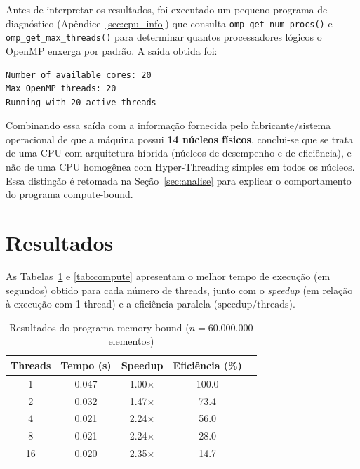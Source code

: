\documentclass[a4paper,12pt]{article}
\begin{document}
Antes de interpretar os resultados, foi executado um pequeno programa de
diagnóstico (Apêndice~\ref{sec:cpu_info}) que consulta
\texttt{omp\_get\_num\_procs()} e \texttt{omp\_get\_max\_threads()} para
determinar quantos processadores lógicos o OpenMP enxerga por padrão. A
saída obtida foi:

\begin{lstlisting}[style=cstyle, language=bash, numbers=none]
Number of available cores: 20
Max OpenMP threads: 20
Running with 20 active threads
\end{lstlisting}

Combinando essa saída com a informação fornecida pelo fabricante/sistema
operacional de que a máquina possui \textbf{14 núcleos físicos}, conclui-se
que se trata de uma CPU com arquitetura híbrida (núcleos de desempenho e de
eficiência), e não de uma CPU homogênea com Hyper-Threading simples em todos
os núcleos. Essa distinção é retomada na Seção~\ref{sec:analise} para
explicar o comportamento do programa compute-bound.

\section{Resultados}

As Tabelas~\ref{tab:memoria} e \ref{tab:compute} apresentam o melhor tempo de
execução (em segundos) obtido para cada número de threads, junto com o
\emph{speedup} (em relação à execução com 1 thread) e a eficiência paralela
($\text{speedup}/\text{threads}$).

\begin{table}[h]
    \centering
    \caption{Resultados do programa memory-bound ($n = 60.000.000$ elementos)}
    \label{tab:memoria}
    \begin{tabular}{ccccc}
        \toprule
        Threads & Tempo (s) & Speedup & Eficiência (\%) \\
        \midrule
        1  & 0.047 & 1.00$\times$ & 100.0 \\
        2  & 0.032 & 1.47$\times$ & 73.4  \\
        4  & 0.021 & 2.24$\times$ & 56.0  \\
        8  & 0.021 & 2.24$\times$ & 28.0  \\
        16 & 0.020 & 2.35$\times$ & 14.7  \\
        \bottomrule
    \end{tabular}
\end{table}
\end{document}
